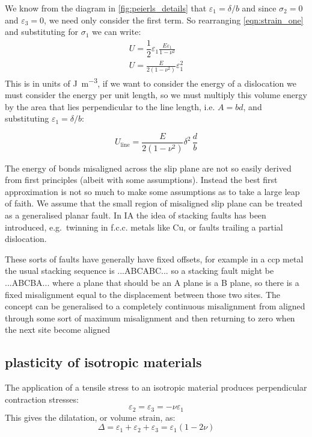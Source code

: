 We know from the diagram in \autoref{fig:peierls_details} that $\varepsilon_1=\delta/b$ and since $\sigma_2=0$ and $\varepsilon_3=0$, we need only consider the first term. So rearranging \autoref{eqn:strain_one} and substituting for $\sigma_1$ we can write:
\begin{align}
U=\dfrac{1}{2} \varepsilon_1 \frac{E\varepsilon_1}{1-\nu^2} \nonumber\\
U= \frac{E}{2(1-\nu^2)}\varepsilon_1^2
\end{align}
This is in units of \si{\joule\per\meter^3}, if we want to consider the energy of a dislocation we must consider the energy per unit length, so we must multiply this volume energy by the area that lies perpendicular to the line length, i.e. $A= bd$, and substituting $\varepsilon_1 = \delta/b$:

\begin{equation}
U_{\text{line}} = \frac{E}{2(1-\nu^2)}\delta^2 \,\frac{d}{b}
\end{equation}

The energy of bonds misaligned across the slip plane are not so easily derived from first principles (albeit with some assumptions). Instead the best first approximation is not so much to make some assumptions as to take a large leap of faith. We assume that the small region of misaligned slip plane can be treated as a generalised planar fault. In IA the idea of stacking faults has been introduced, e.g.\ twinning in f.c.c. metals like Cu, or faults trailing a partial dislocation. 

These sorts of faults have generally have fixed offsets, for example in a ccp metal the usual stacking sequence is ...ABCABC... so a stacking fault might be ...ABCBA... where a plane that should be an A plane is a B plane, so there is a fixed misalignment equal to the displacement between those two sites. The concept can be generalised to a completely continuous misalignment from aligned through some sort of maximum misalignment and then returning to zero when the next site become aligned





\clearpage







\subsection{plasticity of isotropic materials}
The application of a tensile stress to an isotropic material produces perpendicular contraction stresses:
\begin{equation}
\varepsilon_{2} = \varepsilon_{3} = - \nu \varepsilon_{1}
\end{equation}
This gives the dilatation, or volume strain, as:
\begin{equation}
\Delta = \varepsilon_1 + \varepsilon_2 + \varepsilon_3 = \varepsilon_1 (1 - 2\nu)\label{eqn:volume_change_poisson}
\end{equation}
 
